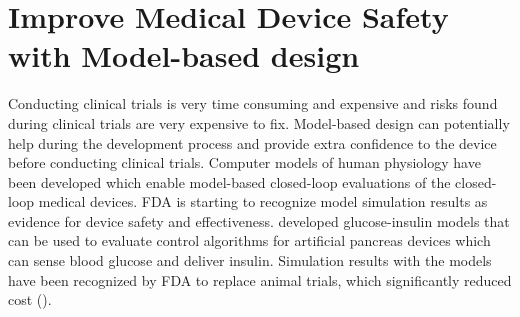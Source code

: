 \section{Improve Medical Device Safety with Model-based design}
Conducting clinical trials is very time consuming and expensive and risks found during clinical trials are very expensive to fix. Model-based design can potentially help during the development process and provide extra confidence to the device before conducting clinical trials. Computer models of human physiology have been developed which enable model-based closed-loop evaluations of the closed-loop medical devices. FDA is starting to recognize model simulation results as evidence for device safety and effectiveness. \cite{pancreas_paul} developed glucose-insulin models that can be used to evaluate control algorithms for artificial pancreas devices which can sense blood glucose and deliver insulin. Simulation results with the models have been recognized by FDA to replace animal trials, which significantly reduced cost (\cite{pancreas}).

